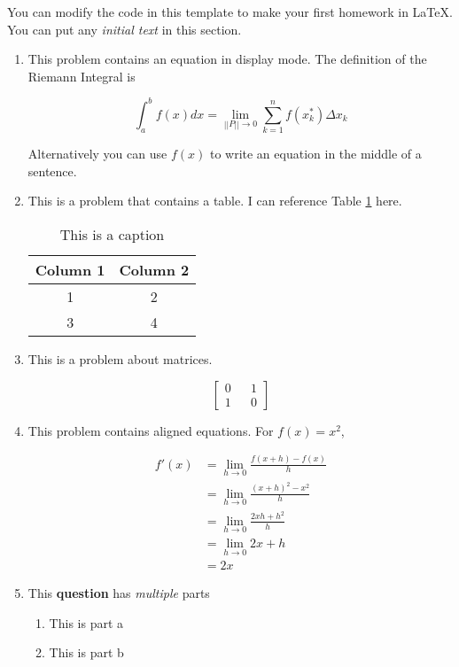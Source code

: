 \documentclass[12pt]{article}
\begin{document}

\noindent You can modify the code in this template to make your first homework in LaTeX. You can put any \textit{initial text} in this section. 


\begin{enumerate}[start=1,label={\bfseries Question \arabic*:},leftmargin=1in] %
    \item This problem contains an equation in display mode. The definition of the Riemann Integral is 

    \[ \int_a^bf(x)dx=\lim_{||P||\rightarrow 0}\sum_{k=1}^nf(x_k^*)\Delta x_k\]

    Alternatively you can use $f(x)$ to write an equation in the middle of a sentence. 
    
    \item This is a problem that contains a table. I can reference Table \ref{tab:my_label} here. 


\begin{table}[h]
    \centering
    \begin{tabular}{|c|c|} \hline 
         Column 1& Column 2\\ \hline \hline 
         1& 2\\ \hline 
         3& 4\\ \hline
    \end{tabular}
    \caption{This is a caption}
    \label{tab:my_label}
\end{table}
  
     \item This is a problem about matrices. 

       \[ \begin{bmatrix}
        0 && 1\\
        1 && 0
    \end{bmatrix}\]

     \item This problem contains aligned equations. For $f(x)=x^2$,

     \begin{align*}
         f'(x)&=\lim_{h\to 0}\frac{f(x+h)-f(x)}{h}\\
         &= \lim_{h\to 0}\frac{(x+h)^2-x^2}{h}\\
         &= \lim_{h\to 0}\frac{2xh+h^2}{h}\\
         &= \lim_{h\to 0}2x+h\\
         &=2x
     \end{align*}
     

\newpage  %

     
\item This \textbf{question} has \textit{multiple} parts
\begin{enumerate}
    \item This is part a
    \item This is part b
\end{enumerate}

\end{enumerate}
\end{document}
